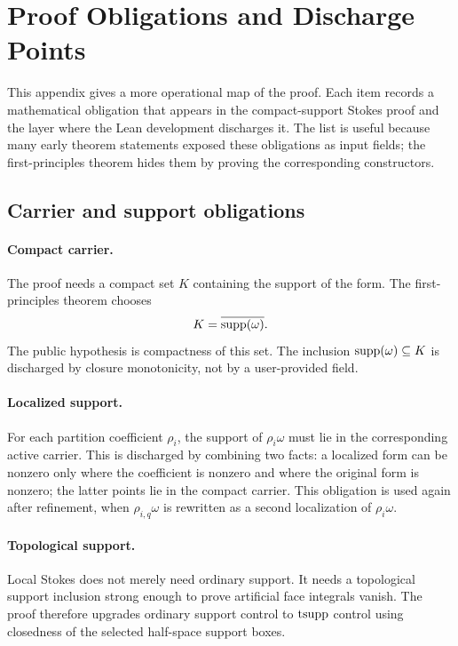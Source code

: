 \section{Proof Obligations and Discharge Points}
\label{app:proof-obligations}

This appendix gives a more operational map of the proof.  Each item records a
mathematical obligation that appears in the compact-support Stokes proof and
the layer where the Lean development discharges it.  The list is useful
because many early theorem statements exposed these obligations as input
fields; the first-principles theorem hides them by proving the corresponding
constructors.

\subsection{Carrier and support obligations}

\paragraph{Compact carrier.}
The proof needs a compact set \(K\) containing the support of the form.  The
first-principles theorem chooses
\[
  K=\overline{\operatorname{supp}(\omega)}.
\]
The public hypothesis is compactness of this set.  The inclusion
\(\operatorname{supp}(\omega)\subseteq K\) is discharged by closure monotonicity, not by a
user-provided field.

\paragraph{Localized support.}
For each partition coefficient \(\rho_i\), the support of \(\rho_i\omega\)
must lie in the corresponding active carrier.  This is discharged by combining
two facts: a localized form can be nonzero only where the coefficient is
nonzero and where the original form is nonzero; the latter points lie in the
compact carrier.  This obligation is used again after refinement, when
\(\rho_{i,q}\omega\) is rewritten as a second localization of
\(\rho_i\omega\).

\paragraph{Topological support.}
Local Stokes does not merely need ordinary support.  It needs a topological
support inclusion strong enough to prove artificial face integrals vanish.
The proof therefore upgrades ordinary support control to \(\operatorname{tsupp}\) control
using closedness of the selected half-space support boxes.

